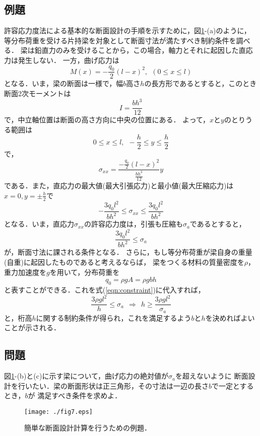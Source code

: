 \documentclass[10pt,a4j]{jbook}
\begin{document}
\subsection{例題}
許容応力度法による基本的な断面設計の手順を示すために，図\ref{fig:fig13_7}-(a)のように，
等分布荷重を受ける片持梁を対象として断面寸法が満たすべき制約条件を調べる．
梁は鉛直力のみを受けることから，この場合，軸力とそれに起因した直応力は発生しない．
一方，曲げ応力は
\begin{equation}
	M(x)=-\frac{q_0}{2}(l-x)^2, \ \ (0 \leq x \leq l)  
\end{equation}
となる．いま，梁の断面は一様で，幅$b$高さ$h$の長方形であるとすると，このとき
断面2次モーメントは
\begin{equation}
	I=\frac{bh^3}{12}
\end{equation}
で，中立軸位置は断面の高さ方向に中央の位置にある．
よって，$x$と$y$のとりうる範囲は
\begin{equation}
	0 \leq  x \leq l, \ \ 
	-\frac{h}{2} \leq  y \leq \frac{h}{2} 
\end{equation}
で，
\begin{equation}
	\sigma_{xx}=\frac{-\frac{q_0}{2}(l-x)^2}{\frac{bh^3}{12}}y
\end{equation}
である．また，直応力の最大値(最大引張応力)と最小値(最大圧縮応力)は
$x=0, y=\pm \frac{h}{2}$で
\begin{equation}
	-\frac{3q_0l^2}{bh^2}
	\leq \sigma_{xx} \leq 
	\frac{3q_0l^2}{bh^2}
\end{equation}
となる．いま，直応力$\sigma_{xx}$の許容応力度は，引張も圧縮も$\sigma_a$であるとすると，
\begin{equation}
	\frac{3q_0l^2}{bh^2} \leq \sigma_a
	\label{eqn:constraint}
\end{equation}
が，断面寸法に課される条件となる．
さらに，もし等分布荷重が梁自身の重量(自重)に起因したものであると考えるならば，
梁をつくる材料の質量密度を$\rho$，重力加速度を$g$を用いて，分布荷重を
\begin{equation}
	q_0=\rho g A=\rho gbh
\end{equation}
と表すことができる．これを式(\ref{eqn:constraint})に代入すれば，
\begin{equation}
	\frac{3\rho g l^2}{h} \leq \sigma_a \ \ 
	\Rightarrow 
	\ \ 
	h \geq \frac{3\rho g l^2}{\sigma_a}
\end{equation}
と，桁高$h$に関する制約条件が得られ，これを満足するよう$b$と$h$を決めればよいことが示される．
\subsection{問題}
図\ref{fig:fig13_7}-(b)と(c)に示す梁について，曲げ応力の絶対値が$\sigma_a$を超えないように
断面設計を行いたい．梁の断面形状は正三角形，その寸法は一辺の長さ$b$で一定とするとき，$b$が
満足すべき条件を求めよ．
\begin{figure}[h]
	\begin{center}
	\texttt{[image: ./fig7.eps]} 
	\end{center}
	\caption{
		簡単な断面設計計算を行うための例題．
	} 
	\label{fig:fig13_7}
\end{figure}
\end{document}
